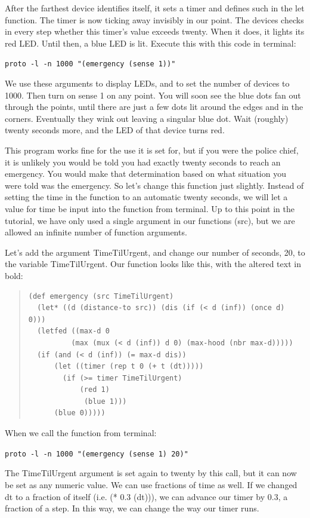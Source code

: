 \documentclass{article}
\newcommand\code[1]{\begin{center}\var{#1}\end{center}}
\newcommand\var[1]{{\tt #1}}
\begin{document}
{After the farthest device identifies itself, it sets a timer and
defines such in the let function. The timer is now ticking away
invisibly in our point. The devices checks in every step whether this
timer's value exceeds twenty. When it does, it lights its red
LED. Until then, a blue LED is lit. Execute this with this code in
terminal:

\code{proto -l -n 1000 "(emergency (sense 1))"}

We use these arguments to display LEDs, and to set the number of
devices to 1000.  Then turn on sense 1 on any point. You will soon see
the blue dots fan out through the points, until there are just a few
dots lit around the edges and in the corners. Eventually they wink out
leaving a singular blue dot. Wait (roughly) twenty seconds more, and
the LED of that device turns red.

This program works fine for the use it is set for, but if you were the
police chief, it is unlikely you would be told you had exactly twenty
seconds to reach an emergency. You would make that determination based
on what situation you were told was the emergency. So let's change
this function just slightly. Instead of setting the time in the
function to an automatic twenty seconds, we will let a value for time
be input into the function from terminal. Up to this point in the
tutorial, we have only used a single argument in our functions (src),
but we are allowed an infinite number of function arguments.

Let's add the argument TimeTilUrgent, and change our number of
seconds, 20, to the variable TimeTilUrgent. Our function looks like
this, with the altered text in bold:

\begin{quote}
\begin{verbatim}
(def emergency (src TimeTilUrgent) 
  (let* ((d (distance-to src)) (dis (if (< d (inf)) (once d) 0))) 
  (letfed ((max-d 0 
	      (max (mux (< d (inf)) d 0) (max-hood (nbr max-d))))) 
  (if (and (< d (inf)) (= max-d dis)) 
      (let ((timer (rep t 0 (+ t (dt))))) 			 
		(if (>= timer TimeTilUrgent) 
		    (red 1) 
	         (blue 1))) 
      (blue 0)))))
\end{verbatim}
\end{quote}

When we call the function from terminal:

\code{proto -l -n 1000 "(emergency (sense 1) 20)"}

The TimeTilUrgent argument is set again to twenty by this call, but it
can now be set as any numeric value. We can use fractions of time as
well. If we changed dt to a fraction of itself (i.e. (* 0.3 (dt))), we
can advance our timer by 0.3, a fraction of a step. In this way, we
can change the way our timer runs.

}
\end{document}
